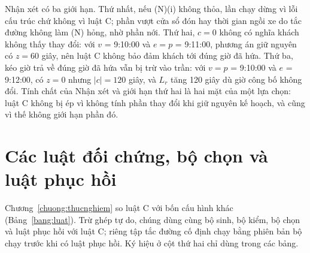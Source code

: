 Nhận xét có ba giới hạn. Thứ nhất, nếu (N)(i) không thỏa, lần chạy dừng vì lỗi cấu trúc chứ không vì luật C;
phần vượt cửa sổ đón hay thời gian ngồi xe do tắc đường không làm (N) hỏng, nhờ phần nới. Thứ hai, $c = 0$ không
có nghĩa khách không thấy thay đổi: với $v$ = 9:10:00 và $e = p$ = 9:11:00, phương án giữ nguyên có $z = 60$
giây, nên luật C không bảo đảm khách tới đúng giờ đã hứa. Thứ ba, kéo giờ trả về đúng giờ đã hứa vẫn bị trừ vào
trần: với $v = p$ = 9:10:00 và $e$ = 9:12:00, có $z = 0$ nhưng $|c| = 120$ giây, và $L_r$ tăng 120 giây dù
giờ công bố không đổi. Tính chất của Nhận xét và giới hạn thứ hai là hai mặt của một lựa chọn: luật C không bị
ép vì không tính phần thay đổi khi giữ nguyên kế hoạch, và cũng vì thế không giới hạn phần đó.

\section{Các luật đối chứng, bộ chọn và luật phục hồi}
\label{muc:doichung}

Chương~\ref{chuong:thucnghiem} so luật C với bốn cấu hình khác (Bảng~\ref{bang:luat}). Trừ ghép tự do, chúng
dùng cùng bộ sinh, bộ kiểm, bộ chọn và luật phục hồi với luật C; riêng tập tắc đường cố định chạy bằng phiên bản
bộ chạy trước khi có luật phục hồi. Ký hiệu ở cột thứ hai chỉ dùng trong các bảng.

